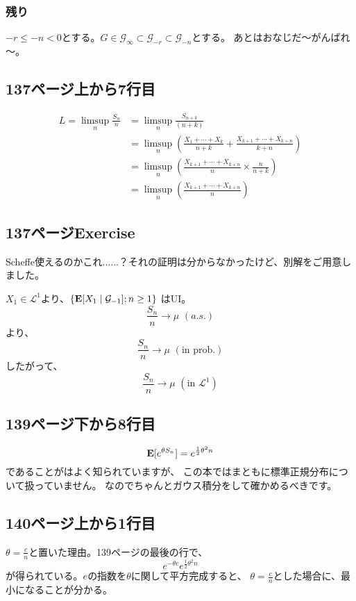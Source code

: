     \subsubsection{残り}
      $-r \leq -n < 0$とする。$G \in \mathcal{G}_{\infty} \subset \mathcal{G}_{-r} \subset \mathcal{G}_{-n}$とする。
      あとはおなじだ～がんばれ～。

  \subsection{137ページ上から7行目}
    \begin{align*}
      L = \limsup_n \frac{S_n}{n} &= \limsup_n \frac{S_{n+k}}{(n+k)} \\
      &= \limsup_n \left(\frac{X_1 + \cdots + X_k}{n+k} + \frac{X_{k+1} + \cdots + X_{k+n}}{k+n}\right)\\
      &= \limsup_n \left(\frac{X_{k+1} + \cdots + X_{k+n}}{n} \times \frac{n}{n+k}\right)\\
      &= \limsup_n \left(\frac{X_{k+1} + \cdots + X_{k+n}}{n} \right)
    \end{align*}

  \subsection{137ページExercise}
    Scheffe使えるのかこれ......？それの証明は分からなかったけど、別解をご用意しました。

    $X_1 \in \mathcal{L}^1$より、$\{{\mathbf{E}}[X_1 \mid \mathcal{G}_{-1}] ; n \ge 1\}$
    はUI。
    \[\frac{S_n}{n} \rightarrow \mu \,\,(a.s.)\]
    より、
    \[\frac{S_n}{n} \rightarrow \mu \,\,(\text{in prob.})\]
     したがって、
     \[\frac{S_n}{n} \rightarrow \mu \,\,(\text{in }\mathcal{L}^1)\]

  \subsection{139ページ下から8行目}
    \[
      {\mathbf{E}}[e^{\theta S_n}] = e^{\frac{1}{2}\theta^2 n}
    \]
    であることがはよく知られていますが、
    この本ではまともに標準正規分布について扱っていません。
    なのでちゃんとガウス積分をして確かめるべきです。

  \subsection{140ページ上から1行目}
    $\theta = \frac{c}{n}$と置いた理由。139ページの最後の行で、
    \[
      e^{-\theta c}e^{\frac{1}{2}\theta^2n}
    \]
    が得られている。$e$の指数を$\theta$に関して平方完成すると、
    $\theta = \frac{c}{n}$とした場合に、最小になることが分かる。

